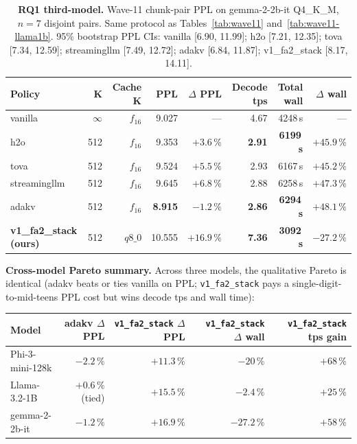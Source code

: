 \documentclass[sigconf, anonymous=false, screen=true]{acmart}
\newcommand{\good}[1]{\textcolor{endurkvgreen}{\textbf{#1}}}
\newcommand{\bad}[1]{\textcolor{endurkvred}{\textbf{#1}}}
\begin{document}
\begin{table}[t]
\caption{\textbf{RQ1 third-model.} Wave-11 chunk-pair PPL on gemma-2-2b-it Q4\_K\_M, $n{=}7$ disjoint pairs. Same protocol as Tables~\ref{tab:wave11} and~\ref{tab:wave11-llama1b}. 95\% bootstrap PPL CIs: vanilla [6.90, 11.99]; h2o [7.21, 12.35]; tova [7.34, 12.59]; streamingllm [7.49, 12.72]; adakv [6.84, 11.87]; v1\_fa2\_stack [8.17, 14.11].}
\label{tab:wave11-gemma2b}
\centering
\small
\begin{tabular}{lrrrrrrr}
\toprule
\textbf{Policy} & \textbf{K} & \textbf{Cache K} & \textbf{PPL} & \textbf{$\Delta$ PPL} & \textbf{Decode tps} & \textbf{Total wall} & \textbf{$\Delta$ wall} \\
\midrule
vanilla         & $\infty$ & $f_{16}$ & 9.027 & ---           & 4.67 & 4248\,s & --- \\
h2o             & 512 & $f_{16}$ & 9.353 & $+3.6\,\%$    & \bad{2.91} & \bad{6199\,s} & $+45.9\,\%$ \\
tova            & 512 & $f_{16}$ & 9.524 & $+5.5\,\%$    & 2.93 & 6167\,s & $+45.2\,\%$ \\
streamingllm    & 512 & $f_{16}$ & 9.645 & $+6.8\,\%$    & 2.88 & 6258\,s & $+47.3\,\%$ \\
adakv~\cite{feng2025adakv}      & 512 & $f_{16}$ & \good{8.915} & \good{$-1.2\,\%$} & \bad{2.86} & \bad{6294\,s} & $+48.1\,\%$ \\
\textbf{v1\_fa2\_stack (ours)}        & 512 & $q8\_0$  & 10.555 & $+16.9\,\%$ & \good{7.36} & \good{3092\,s} & \good{$-27.2\,\%$} \\
\bottomrule
\end{tabular}
\end{table}

\textbf{Cross-model Pareto summary.} Across three models, the qualitative Pareto is identical (adakv beats or ties vanilla on PPL; \texttt{v1\_fa2\_stack} pays a single-digit-to-mid-teens PPL cost but wins decode tps and wall time):

\begin{center}
\small
\begin{tabular}{lrrrr}
\toprule
Model & adakv $\Delta$ PPL & \texttt{v1\_fa2\_stack} $\Delta$ PPL & \texttt{v1\_fa2\_stack} $\Delta$ wall & \texttt{v1\_fa2\_stack} tps gain \\
\midrule
Phi-3-mini-128k & \good{$-2.2\,\%$} & $+11.3\,\%$ & $-20\,\%$ & $+68\,\%$ \\
Llama-3.2-1B & $+0.6\,\%$ (tied) & $+15.5\,\%$ & $-2.4\,\%$ & $+25\,\%$ \\
gemma-2-2b-it & \good{$-1.2\,\%$} & $+16.9\,\%$ & \good{$-27.2\,\%$} & \good{$+58\,\%$} \\
\bottomrule
\end{tabular}
\end{center}
\end{document}
